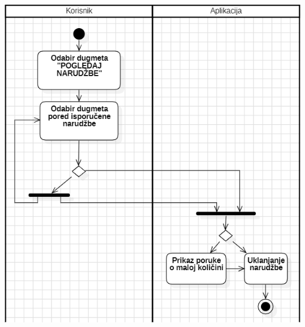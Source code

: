 \documentclass{scrreprt}
\begin{document}
\begin{center}
	\includegraphics[width=14cm]{./img/13.png}
\end{center}

\pagebreak
\end{document}
